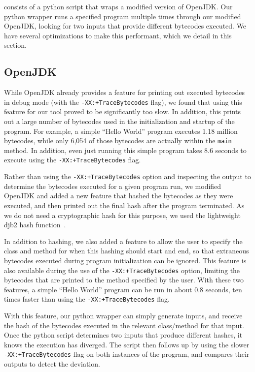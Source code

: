 
\jcupid consists of a python script that wraps a modified version of OpenJDK.
Our python wrapper runs a specified program multiple times through our modified
OpenJDK, looking for two inputs that provide different bytecodes executed. We
have several optimizations to make this performant, which we detail in this
section.

\subsection{OpenJDK}
\label{sec:OpenJDK}

While OpenJDK already provides a feature for printing out executed bytecodes in
debug mode (with the \texttt{-XX:+TraceBytecodes} flag), we found that using
this feature for our tool proved to be significantly too slow. In addition,
this prints out a large number of bytecodes used in the initialization and
startup of the program. For example, a simple ``Hello World'' program executes
1.18 million bytecodes, while only 6,054 of those bytecodes are actually within
the \texttt{main} method. In addition, even just running this simple program
takes 8.6 seconds to execute using the \texttt{-XX:+TraceBytecodes} flag.

Rather than using the \texttt{-XX:+TraceBytecodes} option and inspecting the
output to determine the bytecodes executed for a given program run, we modified
OpenJDK and added a new feature that hashed the bytecodes as they were executed,
and then printed out the final hash after the program terminated. As we do not
need a cryptographic hash for this purpose, we used the lightweight djb2 hash
function~\cite{djb2Hash}.

In addition to hashing, we also added a feature to allow the user
to specify the class and method for when this hashing should start and end, so
that extraneous bytecodes executed during program initialization can be ignored.
This feature is also available during the use of the
\texttt{-XX:+TraceBytecodes} option, limiting the bytecodes that are printed to
the method specified by the user. With these two features, a simple ``Hello
World'' program can be run in about 0.8 seconds, ten times faster than using
the \texttt{-XX:+TraceBytecodes} flag.

With this feature, our python wrapper can simply generate inputs, and receive
the hash of the bytecodes executed in the relevant class/method for that input.
Once the python script determines two inputs that produce different hashes, it
knows the execution has diverged. The script then follows up by using the
slower \texttt{-XX:+TraceBytecodes} flag on both instances of the program, and
compares their outputs to detect the deviation. 

